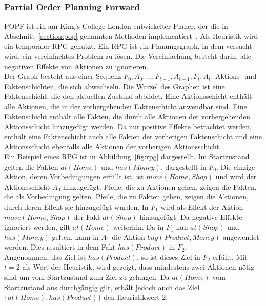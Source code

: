 \subsubsection{Partial Order Planning Forward}
\ac{POPF} ist ein am King’s College London entwickelter Planer, der die in Abschnitt~\ref{section:pop} genannten Methoden implementiert~\citep{popf}.
Als Heuristik wird ein temporaler \ac{RPG} genutzt.
Ein \ac{RPG} ist ein Planungsgraph, in dem versucht wird, ein vereinfachtes Problem zu lösen.
Die Vereinfachung besteht darin, alle negativen Effekte von Aktionen zu ignorieren.\\
Der Graph besteht aus einer Sequenz $F_0, A_0, ..., F_{t-1}, A_{t-1}, F_t, A_t$: Aktions- und Faktenschichten, die sich abwechseln.
Die Wurzel des Graphen ist eine Faktenschicht, die den aktuellen Zustand abbildet.
Eine Aktionsschicht enthält alle Aktionen, die in der vorhergehenden Faktenschicht anwendbar sind.
Eine Faktenschicht enthält alle Fakten, die durch alle Aktionen der vorhergehenden Aktionsschicht hinzugefügt werden.
Da nur positive Effekte betrachtet werden, enthält eine Faktenschicht auch alle Fakten der vorherigen Faktenschicht und eine Aktionsschicht ebenfalls alle Aktionen der vorherigen Aktionsschicht.\\
Ein Beispiel eines \ac{RPG} ist in Abbildung~\ref{fig:rpg} dargestellt.
Im Startzustand gelten die Fakten $at(Home)$ und $has(Money)$, dargestellt in $F_0$.
Die einzige Aktion, deren Vorbedingungen erfüllt ist, ist $move(Home, Shop)$ und wird der Aktionsschicht $A_0$ hinzugefügt.
Pfeile, die zu Aktionen gehen, zeigen die Fakten, die als Vorbedingung gelten.
Pfeile, die zu Fakten gehen, zeigen die Aktionen, durch deren Effekt sie hinzugefügt wurden.
In $F_1$ wird als Effekt der Aktion $move(Home, Shop)$ der Fakt $at(Shop)$ hinzugefügt.
Da negative Effekte ignoriert werden, gilt $at(Home)$ weiterhin.
Da in $F_1$ nun $at(Shop)$ und $has(Money)$ gelten, kann in $A_1$ die Aktion $buy(Product, Money)$ angewendet werden.
Dies resultiert in dem Fakt $has(Product)$ in $F_2$.\\
Angenommen, das Ziel ist $has(Product)$, so ist dieses Ziel in $F_2$ erfüllt.
Mit $t = 2$ als Wert der Heuristik, wird gezeigt, dass mindestens zwei Aktionen nötig sind um vom Startzustand zum Ziel zu gelangen.
Da $at(Home)$ vom Startzustand aus durchgängig gilt, erhält jedoch auch das Ziel $\{at(Home),has(Product)\}$ den Heuristikwert 2.\\
